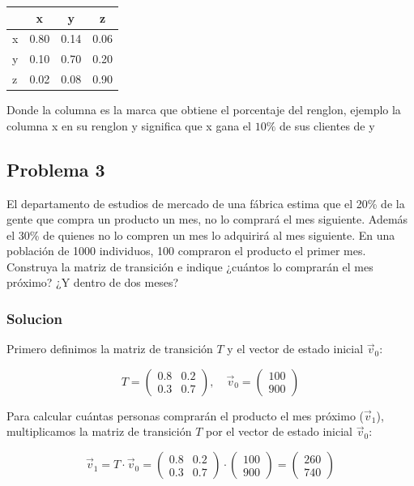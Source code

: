 \documentclass{article}
\begin{document}
\begin{table}[ht]
    \centering
    \begin{tabular}{|l|c c c|}
        \hline
          & x    & y    & z    \\ \hline
        x & 0.80 & 0.14 & 0.06 \\
        y & 0.10 & 0.70 & 0.20 \\
        z & 0.02 & 0.08 & 0.90 \\
        \hline
    \end{tabular}
\end{table}

Donde la columna es la marca que obtiene el porcentaje del renglon, ejemplo la columna x en su renglon y significa que x gana el $10\%$ de sus clientes de y

\newpage

\subsection*{Problema 3}

El departamento de estudios de mercado de una fábrica estima que el 20\% de la gente que compra un producto un mes, no lo comprará el mes siguiente. Además el 30\% de quienes no lo compren un mes lo adquirirá al mes siguiente. En una población de 1000 individuos, 100 compraron el producto el primer mes. Construya la matriz de transición e indique ¿cuántos lo comprarán el mes próximo? ¿Y dentro de dos meses?

\subsubsection*{Solucion}

Primero definimos la matriz de transición \(T\) y el vector de estado inicial \(\vec{v}_0\):

\[
    T = \begin{pmatrix}
        0.8 & 0.2 \\
        0.3 & 0.7
    \end{pmatrix},
    \quad
    \vec{v}_0 = \begin{pmatrix}
        100 \\
        900
    \end{pmatrix}
\]

Para calcular cuántas personas comprarán el producto el mes próximo (\(\vec{v}_1\)), multiplicamos la matriz de transición \(T\) por el vector de estado inicial \(\vec{v}_0\):

\[
    \vec{v}_1 = T \cdot \vec{v}_0 = \begin{pmatrix}
        0.8 & 0.2 \\
        0.3 & 0.7
    \end{pmatrix}
    \cdot
    \begin{pmatrix}
        100 \\
        900
    \end{pmatrix}
    =
    \begin{pmatrix}
        260 \\
        740
    \end{pmatrix}
\]
\end{document}
